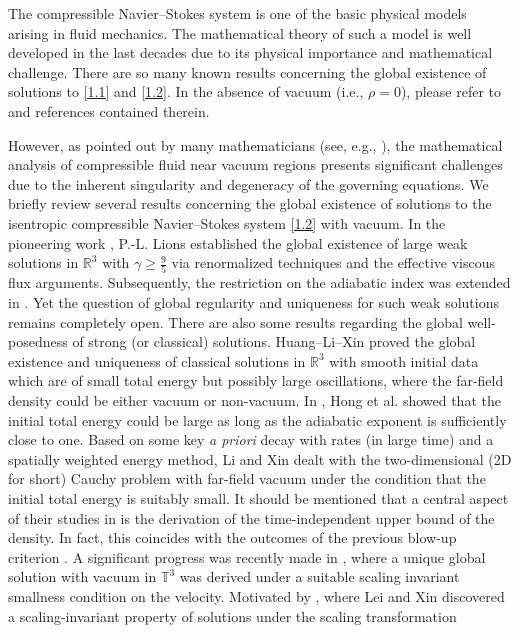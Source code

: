 \documentclass[11pt]{article}
\begin{document}
The compressible Navier--Stokes system is one of the basic physical models arising in fluid mechanics. The mathematical theory of such a model is well developed in the last decades due to its physical importance and mathematical challenge.
There are so many known results concerning the global existence of solutions to
\eqref{1.1} and \eqref{1.2}. In the absence of vacuum (i.e., $\rho=0$),
please refer to \cite{CD10,CCZ10,Da00,DM17,MN1980,Hoff95,Hoff95*,Ho1997} and references contained therein.

However, as pointed out by many mathematicians (see, e.g., \cite{DM23,HLX2012,M1,M2}), the mathematical analysis of compressible fluid near vacuum regions presents significant challenges due to the inherent singularity and degeneracy of the governing equations. We briefly review several results concerning the global existence of solutions to the isentropic compressible Navier--Stokes system \eqref{1.2} with vacuum. In the pioneering work \cite{Li1998}, P.-L. Lions established the global existence of large weak solutions in $\mathbb{R}^3$ with $\gamma\geq\frac95$ via renormalized techniques and the effective viscous flux arguments. Subsequently, the restriction on the adiabatic index was extended in \cite{EF01,JZ01,JZ03}. Yet the question of global regularity and uniqueness for such weak solutions remains completely open. There are also some results regarding the global well-posedness of strong (or classical) solutions. Huang--Li--Xin \cite{HLX2012} proved the global existence and uniqueness of classical solutions in $\mathbb{R}^3$ with smooth initial data which are of small total energy but possibly large oscillations, where the far-field density could be either vacuum or non-vacuum. In \cite{HP24}, Hong et al. showed that the initial total energy could be large as long as the adiabatic exponent is sufficiently close to one. Based on some key {\it a priori} decay with rates (in large time) and a spatially weighted energy method, Li and Xin \cite{LX2019} dealt with the two-dimensional (2D for short) Cauchy problem with far-field vacuum under the condition that the initial total energy is suitably small. It should be mentioned that a central aspect of their studies in \cite{HLX2012,HP24,LX2019} is the derivation of the time-independent upper bound of the density. In fact, this coincides with the outcomes of the previous blow-up criterion \cite{HLX11}. A significant progress was recently
made in \cite{DM23}, where a unique global solution with vacuum in $\mathbb{T}^3$ was derived under a suitable scaling invariant smallness condition on the velocity. Motivated by \cite{LX2019-1}, where Lei and Xin discovered a scaling-invariant property of solutions under the scaling transformation
\end{document}
